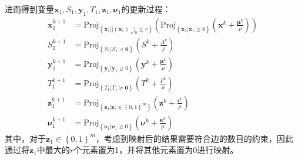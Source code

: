 进而得到变量$\mathbf{x}_1,S_1,\mathbf{y}_1,T_1,\mathbf{z}_1,\mathbf{\nu }_1$的更新过程：
\begin{equation}
    \label{tab:equ-3-47}
    \begin{aligned}
        \mathbf{x}_{1}^{k+1}&=\mathrm{Proj}_{\left\{ \mathbf{x}_1||\left( \mathbf{x}_1 \right) _{:e}|_0\le r \right\}}\left( \mathrm{Proj}_{\left\{ \mathbf{x}_1|\mathbf{x}_1\geqslant 0 \right\}}\left( \mathbf{x}^k+\frac{\boldsymbol{\mu }^k}{\rho} \right) \right) 
        \\
        S_{1}^{k+1}&=\mathrm{Proj}_{\left\{ S_1|S_1\preceq \mathbf{0} \right\}}\left( S^k+\frac{\varLambda ^k}{\rho} \right) 
        \\
        \mathbf{y}_{1}^{k+1}&=\mathrm{Proj}_{\left\{ \mathbf{y}_1|\mathbf{y}_1\geqslant 0 \right\}}\left( \mathbf{y}^k+\frac{\boldsymbol{\mu }^k}{\rho} \right) 
        \\
        T_{1}^{k+1}&=\mathrm{Proj}_{\left\{ T_1|T_1\succcurlyeq \mathbf{0} \right\}}\left( T^k+\frac{\varGamma ^k}{\rho} \right)\\
        \mathbf{z}_{1}^{k+1}&=\mathrm{Proj}_{\left\{ \mathbf{z}_1|\mathbf{z}_1\in \left\{ 0,1 \right\} ^m \right\}}\left( \mathbf{z}^k+\frac{\boldsymbol{\iota }^k}{\rho} \right)
        \\
        \mathbf{\nu }_{1}^{k+1}&=\mathrm{Proj}_{\left\{ \mathbf{\nu }_1|\mathbf{\nu }_1\geqslant 0 \right\}}\left( \mathbf{\nu }^k+\frac{\boldsymbol{\kappa }^k}{\rho} \right)
    \end{aligned}
\end{equation}
其中，对于$\mathbf{z}_1\in \left\{ 0,1 \right\} ^m$，考虑到映射后的结果需要符合边的数目的约束，因此通过将$\mathbf{z}_1$中最大的$r$个元素置为1，并将其他元素置为0进行映射。

